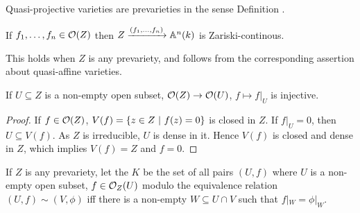 \documentclass[a4paper,parskip=half,numbers=enddot, DIV=12]{scrreprt}
\begin{document}
\begin{cor*}
    Quasi-projective varieties are prevarieties in the sense Definition .
\end{cor*}
\begin{cor}
    If $f_1,\ldots, f_n\in \mathcal{O}(Z)$ then $Z\xrightarrow{(f_1,\ldots, f_n)}\mathbb{A}^n(k)$ is Zariski-continous.
\end{cor}
\begin{rem*}
    This holds when $Z$ is any prevariety, and follows from the corresponding assertion about quasi-affine varieties.
\end{rem*}
\begin{cor}
    If $U\subseteq Z$ is a non-empty open subset, $\Oo(Z)\morphism \Oo(U)$, $f\mapsto f|_U$ is injective.
\end{cor}
\begin{proof}
    If $f\in \mathcal{O}(Z)$, $V(f) = \left\{z\in Z\ \middle|\  f(z)=0\right\}$ is closed in $Z$. If $f|_U=0$, then $U\subseteq V(f)$. As $Z$ is irreducible, $U$ is dense in it. Hence $V(f)$ is closed and dense in $Z$, which implies $V(f)=Z$ and $f=0$.
\end{proof}
\begin{defi}
    If $Z$ is any prevariety, let the  $K$ be the set of all pairs $(U,f)$ where $U$ is a non-empty open subset, $f\in\mathcal{O}_Z(U)$ modulo the equivalence relation $(U,f)\sim (V,\phi)$ iff there is a non-empty $W\subseteq U\cap V$ such that $f|_W= \phi|_W$.
\end{defi}
\end{document}

